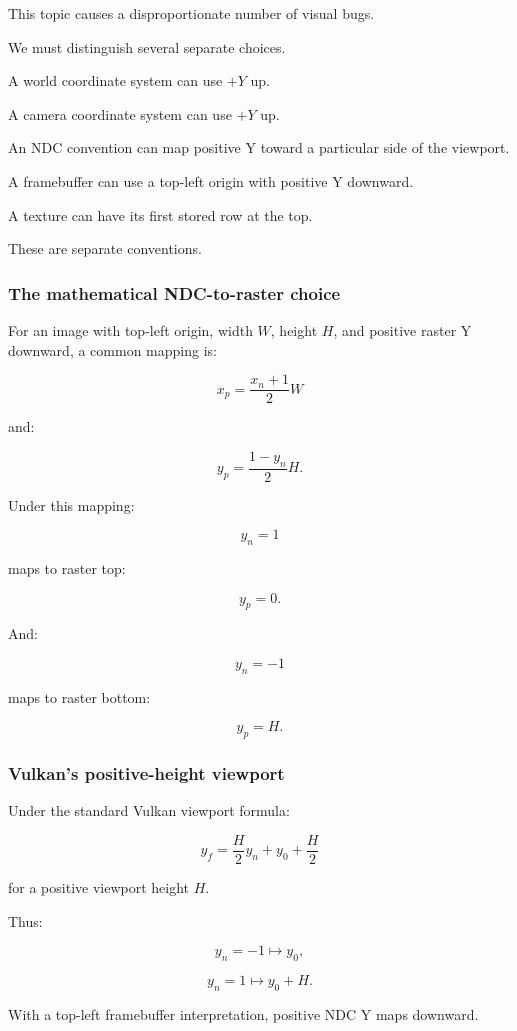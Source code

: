 This topic causes a disproportionate number of visual bugs.

We must distinguish several separate choices.

A world coordinate system can use \(+Y\) up.

A camera coordinate system can use \(+Y\) up.

An NDC convention can map positive Y toward a particular side of the viewport.

A framebuffer can use a top-left origin with positive Y downward.

A texture can have its first stored row at the top.

These are separate conventions.

\subsubsection{The mathematical NDC-to-raster choice}\label{the-mathematical-ndc-to-raster-choice}

For an image with top-left origin, width \(W\), height \(H\), and positive raster Y downward, a common mapping is:

\[
 \boxed{ x_p=\frac{x_n+1}{2}W }
\]

and:

\[
 \boxed{ y_p=\frac{1-y_n}{2}H }.
\]

Under this mapping:

\[
 y_n=1
\]

maps to raster top:

\[
 y_p=0.
\]

And:

\[
 y_n=-1
\]

maps to raster bottom:

\[
 y_p=H.
\]

\subsubsection{Vulkan's positive-height viewport}\label{vulkans-positive-height-viewport}

Under the standard Vulkan viewport formula:

\[
 y_f=\frac{H}{2}y_n+y_0+\frac H2
\]

for a positive viewport height \(H\).

Thus:

\[
 y_n=-1\mapsto y_0,
\]

\[
 y_n=1\mapsto y_0+H.
\]

With a top-left framebuffer interpretation, positive NDC Y maps downward.

